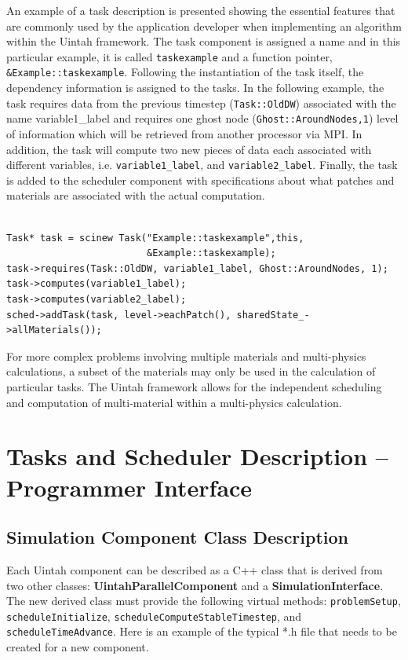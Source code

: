 \documentclass[12pt]{report}
\begin{document}
An example of a task description is presented showing the essential
features that are commonly used by the application developer when
implementing an algorithm within the Uintah framework.  The task
component is assigned a name and in this particular example, it is
called \texttt{taskexample} and a function pointer,
\texttt{\&Example::taskexample}.  Following the instantiation of the
task itself, the dependency information is assigned to the tasks.  In
the following example, the task requires data from the previous
timestep (\texttt{Task::OldDW}) associated with the name
variable1\_label and requires one ghost node
(\texttt{Ghost::AroundNodes,1}) level of information which will be
retrieved from another processor via MPI.  In addition, the task will
compute two new pieces of data each associated with different
variables, i.e. \texttt{variable1\_label}, and
\texttt{variable2\_label}.  Finally, the task is added to the scheduler
component with specifications about what patches and materials are
associated with the actual computation.

\begin{Verbatim}[fontsize=\footnotesize]

Task* task = scinew Task("Example::taskexample",this,
                         &Example::taskexample);
task->requires(Task::OldDW, variable1_label, Ghost::AroundNodes, 1);
task->computes(variable1_label);
task->computes(variable2_label);
sched->addTask(task, level->eachPatch(), sharedState_->allMaterials());

\end{Verbatim}

For more complex problems involving multiple materials and
multi-physics calculations, a subset of the materials may only be used
in the calculation of particular tasks.  The Uintah framework allows
for the independent scheduling and computation of multi-material
within a multi-physics calculation.

\section{Tasks and Scheduler Description -- Programmer Interface}

\subsection{Simulation Component Class Description}

Each Uintah component can be described as a C++ class that is derived
from two other classes: \textbf{UintahParallelComponent} and a
\textbf{SimulationInterface}. The new derived class must provide the
following virtual methods: \texttt{problemSetup},
\texttt{scheduleInitialize}, \texttt{scheduleComputeStableTimestep},
and \texttt{scheduleTimeAdvance}.  Here is an example of the typical
*.h file that needs to be created for a new component.
\end{document}
